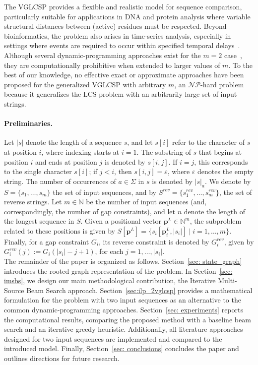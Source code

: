 \documentclass[runningheads]{llncs}
\begin{document}
	The VGLCSP provides a flexible and realistic model for sequence comparison, particularly suitable for applications in DNA and protein analysis where variable structural distances between (active) residues must be respected. Beyond bioinformatics, the problem also arises in time-series analysis, especially in settings where events are required to occur within specified temporal delays~\cite{lainscsek2015delay}.\\
	Although several dynamic-programming approaches exist for the $m=2$ case~\cite{penga2011longest}, they are computationally prohibitive when extended to larger values of $m$. To the best of our knowledge, no effective exact or approximate approaches have been proposed for the generalized VGLCSP with arbitrary $m$, an $\mathcal{NP}$-hard problem because it generalizes the LCS problem with an arbitrarily large set of input strings. \\
	\paragraph{Preliminaries.}	Let $|s|$ denote the length of a sequence $s$, and let $s[i]$ refer to the character of $s$ at position $i$, where indexing starts at $i = 1$. The substring of $s$ that begins at position $i$ and ends at position $j$ is denoted by $s[i,j]$. If $i = j$, this corresponds to the single character $s[i]$; if $j < i$, then $s[i,j] = \varepsilon$, where $\varepsilon$ denotes the empty string.	The number of occurrences of $a \in \Sigma$ in $s$ is denoted by $|s|_a$.	We denote by $S = \{s_1, \ldots, s_m\}$ the set of input sequences, and by $S^{rev} = \{s_1^{rev}, \ldots, s_m^{rev}\}$, the set of reverse strings.  
	Let $m \in \mathbb{N}$ be the number of input sequences (and, correspondingly, the number of gap constraints), and let $n$ denote the length of the longest sequence in $S$.  Given a positional vector $\mathbf{p}^L \in \mathbb{N}^m$,  the subproblem related to these positions is given by $S[\mathbf{p}^L]=\{ s_i[\mathbf{p}^L_i, |s_i|] \mid i=1, \ldots, m\}$.  Finally, for a gap constraint $G_i$, its reverse constraint is denoted by  $G_i^{rev}$, given by $G_i^{rev}(j):=G_i(|s_i|-j+1)$, for each $j=1, \ldots, |s_i|$.  \\ 
	
	The remainder of the paper is organized as follows. Section~\ref{sec: state_graph} introduces the rooted graph representation of the problem. In Section~\ref{sec: imsbs}, we  design our main methodological contribution, the Iterative Multi-Source Beam Search approach. Section~\ref{sec:ilp_2vglcsp} provides a mathematical formulation for the problem with two input sequences as an alternative to the common dynamic-programming approaches.  Section~\ref{sec: experiments} reports the computational results, comparing the proposed method with a baseline beam search and an iterative greedy heuristic. Additionally, all literature approaches designed for two input sequences are implemented and compared to the introduced model.
	Finally, Section~\ref{sec: conclusions} concludes the paper and outlines directions for future research.
	
\end{document}
